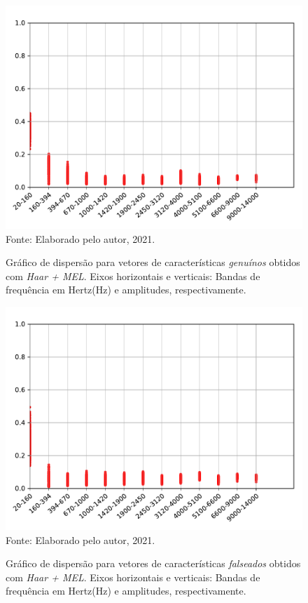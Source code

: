 \begin{figure}[H]
	\centering
	\caption{Gráfico de dispersão para vetores de características \textit{genuínos} obtidos com \textit{Haar + MEL}. Eixos horizontais e verticais: Bandas de frequência em Hertz(Hz) e amplitudes, respectivamente.}
	\includegraphics[scale=.75]{./images/results/barkVersusMel/Genuine_haar_Mel.pdf}
	\label{fig:livehaarmel}
	\\Fonte: Elaborado pelo autor, 2021.
\end{figure}
\begin{figure}[H]
	\centering
	\caption{Gráfico de dispersão para vetores de características \textit{falseados} obtidos com \textit{Haar + MEL}. Eixos horizontais e verticais: Bandas de frequência em Hertz(Hz) e amplitudes, respectivamente.}
	\includegraphics[scale=.75]{./images/results/barkVersusMel/Spoofing_haar_Mel.pdf}
	\label{fig:spoofinghaarmel}
	\\Fonte: Elaborado pelo autor, 2021.
\end{figure}
